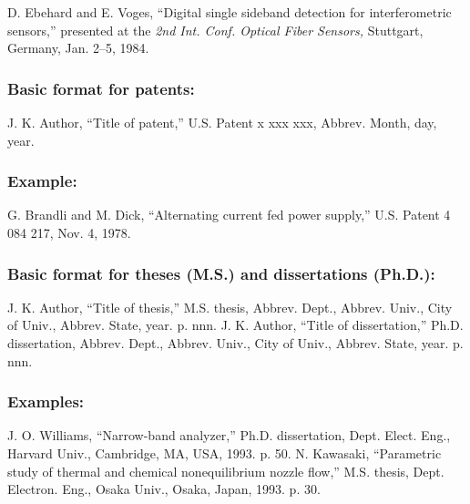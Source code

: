 \documentclass{IEEEoj}
\begin{document}
\begin{thebibliography}{00}
 D. Ebehard and E. Voges, ``Digital single sideband
detection for interferometric sensors,'' presented at the \textit{2nd Int. Conf. Optical Fiber Sensors,} Stuttgart, Germany, Jan. 2--5, 1984.
\end{thebibliography}

\subsubsection*{Basic format for patents:}

\begin{thebibliography}{00}
 J. K. Author, ``Title of patent,'' U.S. Patent {x xxx xxx}, Abbrev. Month, day, year.
\end{thebibliography}

\subsubsection*{Example:}

\begin{thebibliography}{00}
 G. Brandli and M. Dick, ``Alternating current fed power supply,'' U.S. Patent 4 084 217, Nov. 4, 1978.
\end{thebibliography}

\subsubsection*{Basic format for theses (M.S.) and dissertations (Ph.D.):}

\begin{thebibliography}{00}
 J. K. Author, ``Title of thesis,'' M.S. thesis, Abbrev. Dept., Abbrev.
Univ., City of Univ., Abbrev. State, year. p. nnn.
 J. K. Author, ``Title of dissertation,'' Ph.D. dissertation, Abbrev.
Dept., Abbrev. Univ., City of Univ., Abbrev. State, year. p. nnn.
\end{thebibliography}

\subsubsection*{Examples:}

\begin{thebibliography}{00}
 J. O. Williams, ``Narrow-band analyzer,'' Ph.D. dissertation, Dept. Elect. Eng., Harvard Univ., Cambridge, MA, USA, 1993. p. 50.
 N. Kawasaki, ``Parametric study of thermal and chemical nonequilibrium nozzle flow,'' M.S. thesis, Dept. Electron. Eng., Osaka Univ., Osaka, Japan, 1993. p. 30.
\end{thebibliography}
\end{document}
